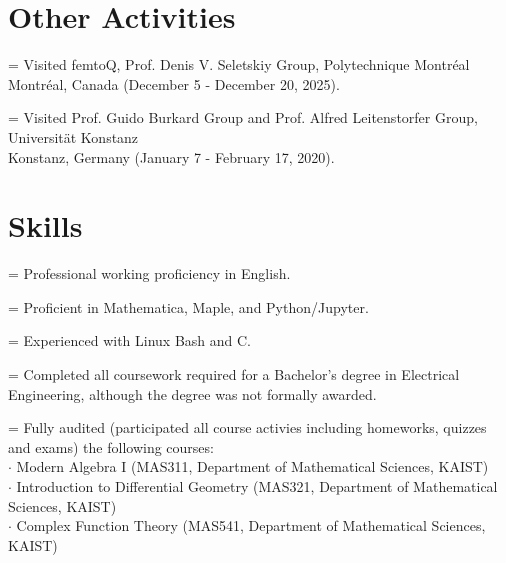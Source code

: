 \documentclass[10pt,letterpaper]{article}
\newlength{\itemwidth}
\newcommand{\cvitem}[2]{%
  \par\begingroup\noindent\hangindent=\itemwidth
  \makebox[\itemwidth][r]{#1.\enspace}#2\par\endgroup\addvspace{\medskipamount}}
\begin{document}
\section*{Other Activities}
\cvitem{2}{Visited femtoQ, Prof. Denis V. Seletskiy Group, Polytechnique Montréal\\
Montréal, Canada (December 5 - December 20, 2025).}
\cvitem{1}{Visited Prof. Guido Burkard Group and Prof. Alfred Leitenstorfer Group, Universität Konstanz\\
Konstanz, Germany (January 7 - February 17, 2020).}

\section*{Skills}
\cvitem{1}{Professional working proficiency in English.}
\cvitem{2}{Proficient in Mathematica, Maple, and Python/Jupyter.}
\cvitem{3}{Experienced with Linux Bash and C.}
\cvitem{4}{Completed all coursework required for a Bachelor's degree in Electrical Engineering, although the degree was not formally awarded.}
\cvitem{5}{Fully audited (participated all course activies including homeworks, quizzes and exams) the following courses:\\
$\cdot$ Modern Algebra I (MAS311, Department of Mathematical Sciences, KAIST)\\
$\cdot$ Introduction to Differential Geometry (MAS321, Department of Mathematical Sciences, KAIST)\\
$\cdot$ Complex Function Theory (MAS541, Department of Mathematical Sciences, KAIST)
}
\end{document}
